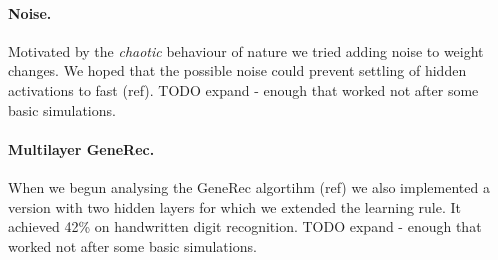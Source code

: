 

\paragraph{Noise.} 

Motivated by the \emph{chaotic} behaviour of nature we tried adding noise to weight changes. We hoped that the possible noise could prevent settling of hidden activations to fast (ref). 
TODO expand - enough that worked not after some basic simulations. 



\paragraph{Multilayer GeneRec.}

When we begun analysing the GeneRec algortihm (ref) we also implemented a version with two hidden layers for which we extended the learning rule. It achieved 42\% on handwritten digit recognition. 
TODO expand - enough that worked not after some basic simulations. 

